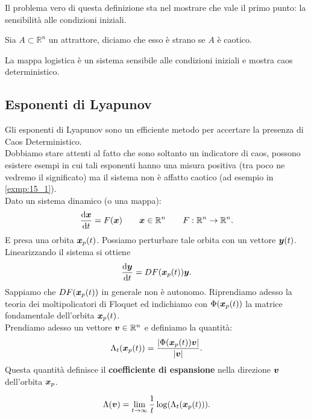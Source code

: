 \noindent
Il problema vero di questa definizione sta nel mostrare che vale il primo punto: la sensibilità alle condizioni iniziali.
\begin{defn}
    Sia $A \subset \mathbb{R}^n$ un attrattore, diciamo che esso è strano se $A$ è caotico.
\end{defn}
\noindent
\begin{exmp}
    La mappa logistica è un sistema sensibile alle condizioni iniziali e mostra caos deterministico.
\end{exmp}
\noindent
\subsection{Esponenti di Lyapunov}%
Gli esponenti di Lyapunov sono un efficiente metodo per accertare la presenza di Caos Deterministico.\\
Dobbiamo stare attenti al fatto che sono soltanto un indicatore di caos, possono esistere esempi in cui tali esponenti hanno una misura positiva (tra poco ne vedremo il significato) ma il sistema non è affatto caotico (ad esempio in \ref{exmp:15_1}).\\
Dato un sistema dinamico (o una mappa):
\[
    \frac{\text{d} \boldsymbol{x}}{\text{d} t} = F(\boldsymbol{x}) \qquad  \boldsymbol{x}\in \mathbb{R}^n \qquad F:\mathbb{R}^n\to \mathbb{R}^n
.\] 
E presa una orbita $\boldsymbol{x}_p(t)$. Possiamo perturbare tale orbita con un vettore $\boldsymbol{y}(t)$.\\
Linearizzando il sistema si ottiene 
\[
    \frac{\text{d} \boldsymbol{y}}{\text{d} t} = DF(\boldsymbol{x}_p(t)) \boldsymbol{y}
.\] 
Sappiamo che $DF(\boldsymbol{x}_p(t))$ in generale non è autonomo. Riprendiamo adesso la teoria dei moltipolicatori di Floquet ed indichiamo con $\Phi (\boldsymbol{x}_p(t))$  la matrice fondamentale dell'orbita $\boldsymbol{x}_p(t)$.\\
Prendiamo adesso un vettore $\boldsymbol{v}\in \mathbb{R}^n$  e definiamo la quantità:
\[
    \Lambda_t(\boldsymbol{x}_p(t)) = \frac{\left|\Phi (\boldsymbol{x}_p(t) ) \boldsymbol{v}\right|}{\left|\boldsymbol{v}\right|} 
.\] 
Questa quantità definisce il \textbf{coefficiente di espansione} nella direzione $\boldsymbol{v}$ dell'orbita $\boldsymbol{x}_p$.
\begin{defn}
    \[
	\Lambda (\boldsymbol{v}) = \lim_{t \to \infty} \frac{1}{t}\log(\Lambda_t(\boldsymbol{x}_p(t) )) 
    .\] 
\end{defn}
